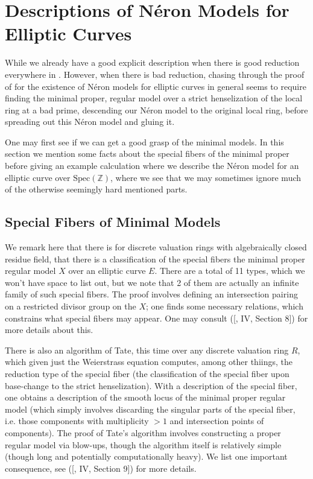 \documentclass{article}
\theoremstyle{definition}
\theoremstyle{remark}
\theoremstyle{plain}
\newcommand{\Z}{\mathbb{Z}}
\begin{document}
\section{Descriptions of N\'eron Models for Elliptic Curves}


While we already have a good explicit description when there is good reduction everywhere in .
However, when there is bad reduction, chasing through the proof of  for the existence of N\'eron models for elliptic curves in general seems to require finding the minimal proper, regular model over a strict henselization of the local ring at a bad prime, descending our N\'eron model to the original local ring, before spreading out this N\'eron model and gluing it.\newline

\indent One may first see if we can get a good grasp of the minimal models.
In this section we mention some facts about the special fibers of the minimal proper before giving an example calculation where we describe the N\'eron model for an elliptic curve over $\text{Spec}(\Z)$, where we see that we may sometimes ignore much of the otherwise seemingly hard mentioned parts.

\subsection{Special Fibers of Minimal Models}

We remark here that there is for discrete valuation rings with algebraically closed residue field, that there is a classification of the special fibers the minimal proper regular model $X$ over an elliptic curve $E$.
There are a total of 11 types, which we won't have space to list out, but we note that 2 of them are actually an infinite family of such special fibers.
The proof involves defining an intersection pairing on a restricted divisor group on the $X$; one finds some necessary relations, which constrains what special fibers may appear.
One may consult ([\cite{AEC2}, IV, Section 8]) for more details about this. \newline

\indent There is also an algorithm of Tate, this time over any discrete valuation ring $R$, which given just the Weierstrass equation computes, among other thiings, the reduction type of the special fiber (the classification of the special fiber upon base-change to the strict henselization).
With a description of the special fiber, one obtains a description of the smooth locus of the minimal proper regular model (which simply involves discarding the singular parts of the special fiber, i.e. those components with multiplicity $> 1$ and intersection points of components).
The proof of Tate's algorithm involves constructing a proper regular model via blow-ups, though the algorithm itself is relatively simple (though long and potentially computationally heavy).
We list one important consequence, see ([\cite{AEC2}, IV, Section 9]) for more details.
\end{document}

